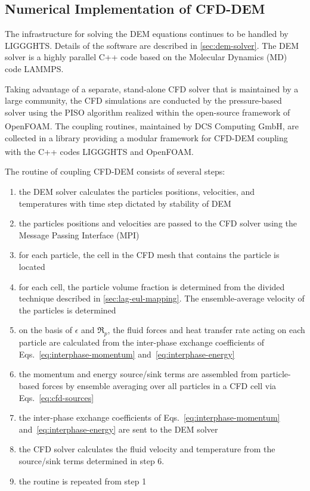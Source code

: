 \subsection{Numerical Implementation of CFD-DEM}\label{sec:cfd-dem-solver}

The infrastructure for solving the DEM equations continues to be handled by LIGGGHTS. Details of the software are described in \cref{sec:dem-solver}. The DEM solver is a highly parallel C++ code based on the Molecular Dynamics (MD) code LAMMPS.\cite{Plimpton1995}

Taking advantage of a separate, stand-alone CFD solver that is maintained by a large community, the CFD simulations are conducted by the pressure-based solver using the PISO algorithm realized within the open-source framework of OpenFOAM\textsuperscript{\textregistered}.\cite{Issa1986,OpenCFDLtd2014} The coupling routines, maintained by DCS Computing GmbH, are collected in a library providing a modular framework for CFD-DEM coupling with the C++ codes LIGGGHTS and OpenFOAM\textsuperscript{\textregistered}.\cite{Kloss2012,Goniva2012}


The routine of coupling CFD-DEM consists of several steps:
\begin{enumerate}
\item the DEM solver calculates the particles positions, velocities, and temperatures with time step dictated by stability of DEM
\item the particles positions and velocities are passed to the CFD solver using the Message Passing Interface (MPI)
\item for each particle, the cell in the CFD mesh that contains the particle is located
\item for each cell, the particle volume fraction is determined from the divided technique described in \cref{sec:lag-eul-mapping}. The ensemble-average velocity of the particles is determined
\item on the basis of $\epsilon$ and $\Re_p$, the fluid forces and heat transfer rate acting on each particle are calculated from the inter-phase exchange coefficients of Eqs.~\ref{eq:interphase-momentum} and~\ref{eq:interphase-energy}
\item the momentum and energy source/sink terms are assembled from particle-based forces by ensemble averaging over all particles in a CFD cell via Eqs.~\ref{eq:cfd-sources}
\item the inter-phase exchange coefficients of Eqs.~\ref{eq:interphase-momentum} and~\ref{eq:interphase-energy} are sent to the DEM solver
\item the CFD solver calculates the fluid velocity and temperature from the source/sink terms determined in step 6.
\item the routine is repeated from step 1
\end{enumerate}

